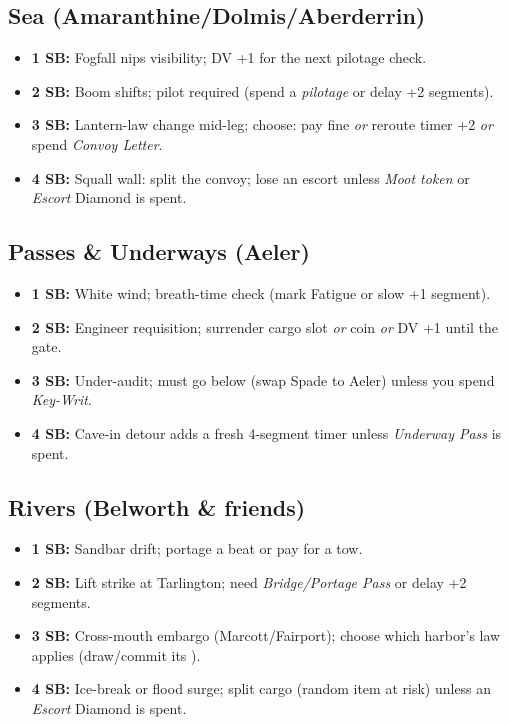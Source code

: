 \documentclass[11pt,letterpaper,twoside]{book}
\begin{document}
\subsection{Sea (Amaranthine/Dolmis/Aberderrin)}
\begin{itemize}
  \item \textbf{1 SB:} Fogfall nips visibility; DV +1 for the next pilotage check.
  \item \textbf{2 SB:} Boom shifts; pilot required (spend a \emph{pilotage} \diamondsuit{} or delay +2 segments).
  \item \textbf{3 SB:} Lantern-law change mid-leg; choose: pay fine \emph{or} reroute timer +2 \emph{or} spend \emph{Convoy Letter}.
  \item \textbf{4 SB:} Squall wall: split the convoy; lose an escort unless \emph{Moot token} or \emph{Escort} Diamond is spent.
\end{itemize}

\subsection{Passes \& Underways (Aeler)}
\begin{itemize}
  \item \textbf{1 SB:} White wind; breath-time check (mark Fatigue or slow +1 segment).
  \item \textbf{2 SB:} Engineer requisition; surrender cargo slot \emph{or} coin \emph{or} DV +1 until the gate.
  \item \textbf{3 SB:} Under-audit; must go below (swap Spade to Aeler) unless you spend \emph{Key-Writ}.
  \item \textbf{4 SB:} Cave-in detour adds a fresh 4-segment timer unless \emph{Underway Pass} is spent.
\end{itemize}

\subsection{Rivers (Belworth \& friends)}
\begin{itemize}
  \item \textbf{1 SB:} Sandbar drift; portage a beat or pay for a tow.
  \item \textbf{2 SB:} Lift strike at Tarlington; need \emph{Bridge/Portage Pass} or delay +2 segments.
  \item \textbf{3 SB:} Cross-mouth embargo (Marcott/Fairport); choose which harbor's law applies (draw/commit its \diamondsuit).
  \item \textbf{4 SB:} Ice-break or flood surge; split cargo (random item at risk) unless an \emph{Escort} Diamond is spent.
\end{itemize}
\end{document}
